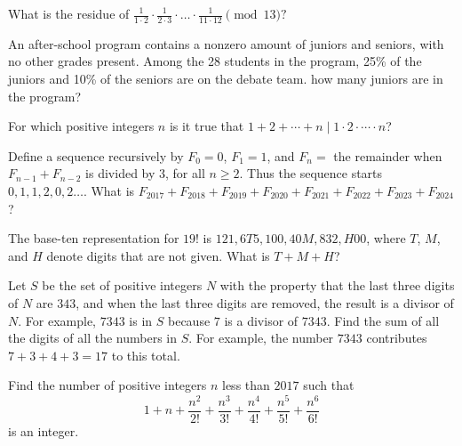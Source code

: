 \documentclass[mast]{lucky}
\begin{document}
\begin{prob}[]{2}
What is the residue of $\frac{1}{1\cdot 2}\cdot \frac{1}{2\cdot 3}\cdot \dots \cdot \frac{1}{11\cdot 12}\pmod {13}?$
\end{prob}

\begin{prob}{2}
An after-school program contains a nonzero amount of juniors and seniors, with no other grades present. Among the 28 students in the program, 25\% of the juniors and 10\% of the seniors are on the debate team. how many juniors are in the program?
\end{prob}

\begin{prob}{3}
For which positive integers $n$ is it true that $1+2+\cdots+n\mid 1\cdot 2\cdot \cdots \cdot n$?
\end{prob}

\begin{prob}[AMC 10A 2017/13]{3}
Define a sequence recursively by $F_0 = 0$, $F_1 = 1$, and $F_n = $ the remainder when $F_{n-1} + F_{n-2}$ is divided by $3$, for all $n \ge 2$. Thus the sequence starts $0,1,1,2,0,2 \ldots$. What is $F_{2017} + F_{2018} + F_{2019} + F_{2020} + F_{2021} + F_{2022} + F_{2023} + F_{2024}$?
\end{prob}

\begin{req}[AMC 10B 2019/14]{4}
The base-ten representation for $19!$ is $121,6T5,100,40M,832,H00$, where $T$, $M$, and $H$ denote digits that are not given. What is $T+M+H$?
\end{req}

\begin{prob}{4}
Let $S$ be the set of positive integers $N$ with the property that the last three digits of $N$ are $343$, and when the last three digits are removed, the result is a divisor of $N$. For example, $7343$ is in $S$ because $7$ is a divisor of $7343$. Find the sum of all the digits of all the numbers in $S$. For example, the number $7343$ contributes $7+3+4+3=17$ to this total.
\end{prob}

\begin{prob}[AIME II 2017/8]{6}
Find the number of positive integers $n$ less than $2017$ such that
\[ 1+n+\frac{n^2}{2!}+\frac{n^3}{3!}+\frac{n^4}{4!}+\frac{n^5}{5!}+\frac{n^6}{6!} \]is an integer.
\end{prob}
\end{document}
